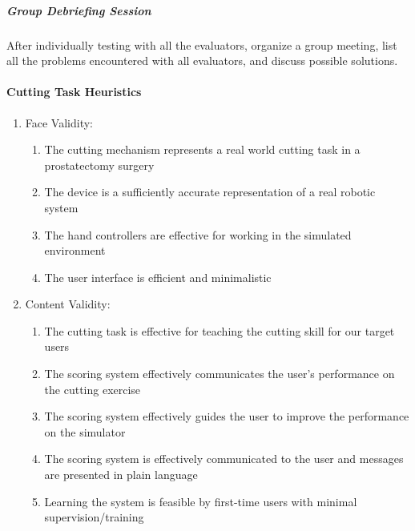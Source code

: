 \subparagraph{Group Debriefing Session}
After individually testing with all the evaluators, organize a group meeting, list all the problems encountered with all evaluators, and discuss possible solutions.

\paragraph{Cutting Task Heuristics}
\begin{enumerate}[1.]
  \item Face Validity:
	\begin{enumerate}[\em a\em)]
	  \item The cutting mechanism represents a real world cutting task in a prostatectomy surgery
	  \item The device is a sufficiently accurate representation of a real robotic system
	  \item The hand controllers are effective for working in the simulated environment
	  \item The user interface is efficient and minimalistic
	\end{enumerate}

  \item Content Validity:
	\begin{enumerate}[\em a\em)]
	  \item The cutting task is effective for teaching the cutting skill for our target users
	  \item The scoring system effectively communicates the user's performance on the cutting exercise
	  \item The scoring system effectively guides the user to improve the performance on the simulator
	  \item The scoring system is effectively communicated to the user and messages are presented in plain language
	  \item Learning the system is feasible by first-time users with minimal supervision/training
	\end{enumerate}


\end{enumerate}
